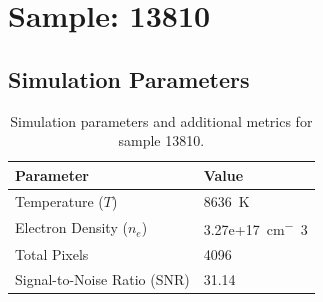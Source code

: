 \documentclass[a4paper,11pt]{article}
\begin{document}
\clearpage

\section{Sample: 13810}
\subsection{Simulation Parameters}
\begin{table}[h!]
    \centering
    \begin{tabular}{ll}
        \toprule
        \textbf{Parameter} & \textbf{Value} \\
        \midrule
        Temperature ($T$) & 8636 \,\si{K} \\
        Electron Density ($n_e$) & 3.27e+17 \,\si{cm^-3} \\
        Total Pixels & 4096 \\
        Signal-to-Noise Ratio (SNR) & 31.14 \\
        \bottomrule
    \end{tabular}
    \caption{Simulation parameters and additional metrics for sample 13810.}
    \label{tab:params_13810}
\end{table}
\end{document}
